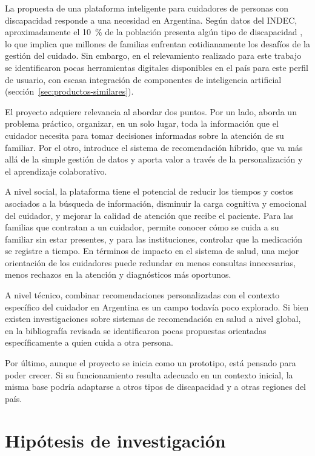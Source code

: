 La propuesta de una plataforma inteligente para cuidadores de personas con discapacidad responde a una necesidad en Argentina. Según datos del INDEC, aproximadamente el 10~\% de la población presenta algún tipo de discapacidad \citep{indec2018}, lo que implica que millones de familias enfrentan cotidianamente los desafíos de la gestión del cuidado. Sin embargo, en el relevamiento realizado para este trabajo se identificaron pocas herramientas digitales disponibles en el país para este perfil de usuario, con escasa integración de componentes de inteligencia artificial (sección~\ref{sec:productos-similares}).

El proyecto adquiere relevancia al abordar dos puntos. Por un lado, aborda un problema práctico, organizar, en un solo lugar, toda la información que el cuidador necesita para tomar decisiones informadas sobre la atención de su familiar. Por el otro, introduce el sistema de recomendación híbrido, que va más allá de la simple gestión de datos y aporta valor a través de la personalización y el aprendizaje colaborativo.

A nivel social, la plataforma tiene el potencial de reducir los tiempos y costos asociados a la búsqueda de información, disminuir la carga cognitiva y emocional del cuidador, y mejorar la calidad de atención que recibe el paciente. Para las familias que contratan a un cuidador, permite conocer cómo se cuida a su familiar sin estar presentes, y para las instituciones, controlar que la medicación se registre a tiempo. En términos de impacto en el sistema de salud, una mejor orientación de los cuidadores puede redundar en menos consultas innecesarias, menos rechazos en la atención y diagnósticos más oportunos.

A nivel técnico, combinar recomendaciones personalizadas con el contexto específico del cuidador en Argentina es un campo todavía poco explorado. Si bien existen investigaciones sobre sistemas de recomendación en salud a nivel global, en la bibliografía revisada se identificaron pocas propuestas orientadas específicamente a quien cuida a otra persona.

Por último, aunque el proyecto se inicia como un prototipo, está pensado para poder crecer. Si su funcionamiento resulta adecuado en un contexto inicial, la misma base podría adaptarse a otros tipos de discapacidad y a otras regiones del país.

\section{Hipótesis de investigación}

